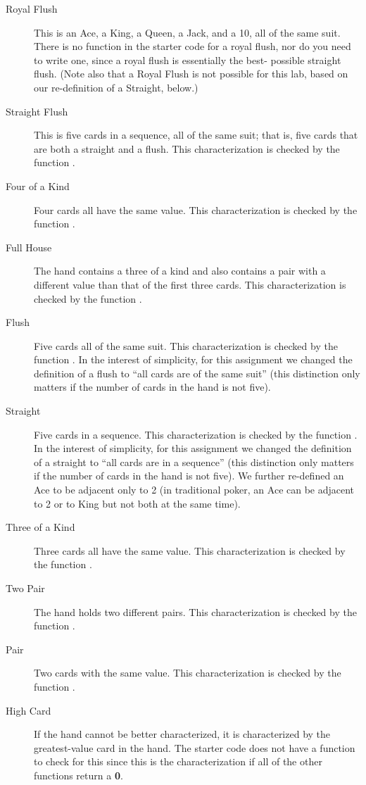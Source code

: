 \begin{description}
\item[Royal Flush] This is an Ace, a King, a Queen, a Jack, and a 10, all of
    the same suit. There is no function in the starter code for a royal flush,
    nor do you need to write one, since a royal flush is essentially the
    best- possible straight flush. (Note also that a Royal Flush is not possible
    for this lab, based on our re-definition of a Straight, below.)
\item[Straight Flush] This is five cards in a sequence, all of the same suit;
    that is, five cards that are both a straight and a flush. This
    characterization is checked by the function .
\item[Four of a Kind] Four cards all have the same value. This
    characterization is checked by the function .
\item[Full House] The hand contains a three of a kind and also contains a pair
    with a different value than that of the first three cards. This
    characterization is checked by the function .
\item[Flush] Five cards all of the same suit. This characterization is checked
    by the function . In the interest of simplicity, for
    this assignment we changed the definition of a flush to ``all cards are of
    the same suit'' (this distinction only matters if the number of cards in
    the hand is not five).
\item[Straight] Five cards in a sequence. This characterization is checked by
    the function . In the interest of simplicity, for
    this assignment we changed the definition of a straight to ``all cards are
    in a sequence'' (this distinction only matters if the number of cards in
    the hand is not five). We further re-defined an Ace to be adjacent only to
    2 (in traditional poker, an Ace can be adjacent to 2 or to King but not
    both at the same time).
\item[Three of a Kind] Three cards all have the same value. This
    characterization is checked by the function .
\item[Two Pair] The hand holds two different pairs. This characterization is
    checked by the function .
\item[Pair] Two cards with the same value. This characterization is checked by
    the function .
\item[High Card] If the hand cannot be better characterized, it is
    characterized by the greatest-value card in the hand. The starter code
    does not have a function to check for this since this is the
    characterization if all of the other functions return a \textbf{0}.
\end{description}

